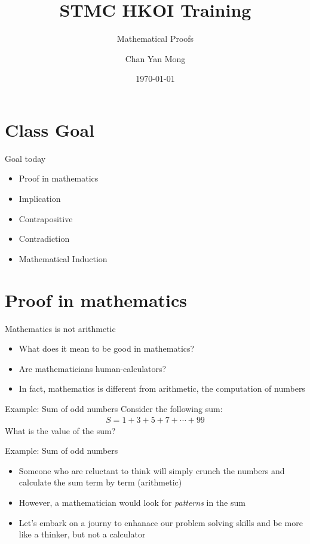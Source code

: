 \documentclass[10pt,xcolor={table,dvipsnames},t]{beamer}
\title[Your Short Title]{STMC HKOI Training}
\subtitle{Mathematical Proofs}
\author{Chan Yan Mong}
\date{\today}
\begin{document}
\begin{frame}
  \titlepage
\end{frame}


\section{Class Goal}

\begin{frame}{Goal today}

\begin{itemize}
  \item Proof in mathematics
  \item Implication 
  \item Contrapositive
  \item Contradiction
  \item Mathematical Induction
\end{itemize}

\end{frame}


\section{Proof in mathematics}
\begin{frame}{Mathematics is not arithmetic}
    \begin{itemize}
      \item What does it mean to be good in mathematics?
      \item Are mathematicians human-calculators?
      \item In fact, mathematics is different from arithmetic, the computation of numbers
    \end{itemize}
\end{frame}

\begin{frame}{Example: Sum of odd numbers}
  Consider the following sum:
  \begin{align*}
    S=1 + 3 + 5 + 7 + \cdots + 99
  \end{align*}
  What is the value of the sum?
\end{frame}

\begin{frame}{Example: Sum of odd numbers}
  \begin{itemize}
    \item Someone who are reluctant to think will simply crunch the numbers and calculate the sum term by term (arithmetic)
    \item However, a mathematician would look for \textit{patterns} in the sum
    \item Let's embark on a journy to enhanace our problem solving skills and be more like a thinker, but not a calculator
  \end{itemize}
\end{frame}
\end{document}
